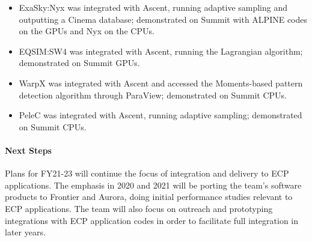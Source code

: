 \begin{itemize}  
	\setlength{\itemsep}{1pt}
	\setlength{\parskip}{0pt}
	\setlength{\parsep}{0pt}
	\item ExaSky:Nyx was integrated with Ascent, running adaptive sampling and outputting a Cinema database; demonstrated on Summit with ALPINE codes on the GPUs and Nyx on the CPUs. 
	\item EQSIM:SW4 was integrated with Ascent, running the Lagrangian algorithm; demonstrated on Summit GPUs.  
	\item WarpX was integrated with Ascent and accessed the Moments-based pattern detection algorithm through ParaView; demonstrated on Summit CPUs.
	\item PeleC was integrated with Ascent, running adaptive sampling; demonstrated on Summit CPUs.
\end{itemize}

\paragraph{Next Steps}

Plans for FY21-23 will continue the focus of integration and delivery to ECP applications. The emphasis in 2020 and 2021 will be porting the team’s software products to Frontier and Aurora, doing initial performance studies relevant to ECP applications. The team will also focus on outreach and prototyping integrations with ECP application codes in order to facilitate full integration in later years.

